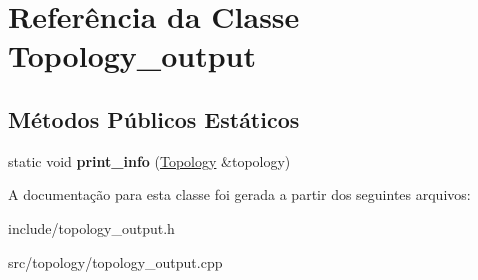 \hypertarget{classTopology__output}{
\section{Referência da Classe Topology\_\-output}
\label{classTopology__output}
}
\subsection*{Métodos Públicos Estáticos}
\begin{DoxyCompactItemize}
\item 
\hypertarget{classTopology__output_a5569bc93f1d8c4b1d244780983d6de3c}{
static void {\bfseries print\_\-info} (\hyperlink{classTopology}{Topology} \&topology)}
\label{classTopology__output_a5569bc93f1d8c4b1d244780983d6de3c}

\end{DoxyCompactItemize}


A documentação para esta classe foi gerada a partir dos seguintes arquivos:\begin{DoxyCompactItemize}
\item 
include/topology\_\-output.h\item 
src/topology/topology\_\-output.cpp\end{DoxyCompactItemize}
